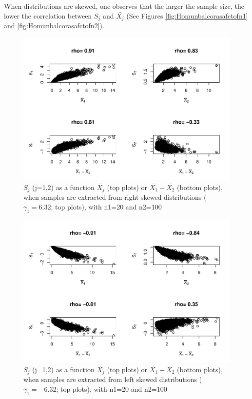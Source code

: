 \documentclass[
  man]{apa6}
\begin{document}
When distributions are skewed, one observes that the larger the sample size, the lower the correlation between \(S_j\) and \(\bar{X_j}\) (See Figures \ref{fig:Homunbalcorasafctofn1} and \ref{fig:Homunbalcorasafctofn2}).

\begin{figure}
\centering
\includegraphics{Correlations-between-the-sample-means-difference-and-standardizers-of-all-estimators,-and-implications-on-biases-and-variances-of-all-estimators_files/figure-latex/pltSDHomunbalRskew-1.pdf}
\caption{\label{fig:pltSDHomunbalRskew}\(S_j\) (j=1,2) as a function \(\bar{X_j}\) (top plots) or \(\bar{X_1}-\bar{X_2}\) (bottom plots), when samples are extracted from right skewed distributions (\(\gamma_1 = 6.32\); top plots), with n1=20 and n2=100}
\end{figure}

\begin{figure}
\centering
\includegraphics{Correlations-between-the-sample-means-difference-and-standardizers-of-all-estimators,-and-implications-on-biases-and-variances-of-all-estimators_files/figure-latex/pltSDHomunbalLskew-1.pdf}
\caption{\label{fig:pltSDHomunbalLskew}\(S_j\) (j=1,2) as a function \(\bar{X_j}\) (top plots) or \(\bar{X_1}-\bar{X_2}\) (bottom plots), when samples are extracted from left skewed distributions (\(\gamma_1 = -6.32\); top plots), with n1=20 and n2=100}
\end{figure}
\end{document}
